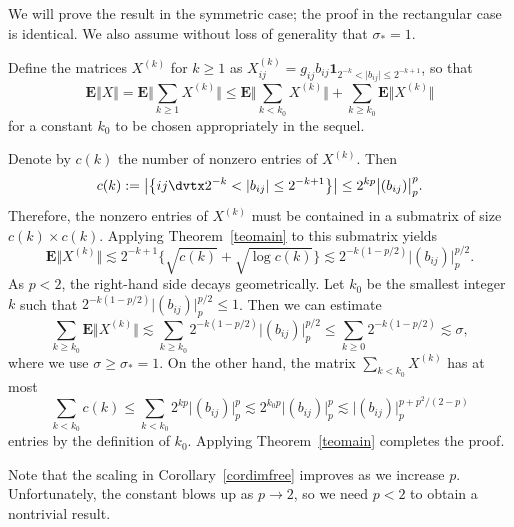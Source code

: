 \documentclass[aop,MSNbibl,dvips]{arximspdf}
\newcommand{\rrvert}{\vert}
\newcommand{\rrVert}{\Vert}
\newcommand{\llvert}{\vert}
\newcommand{\llVert}{\Vert}
\newcommand{\EE}{\mathbf{E}}
\begin{document}
\begin{pf}
We will prove the result in the symmetric case; the proof in the
rectangular case is identical. We also assume without loss of generality
that $\sigma_*=1$.

Define the matrices $X^{(k)}$ for $k\ge1$ as
$X^{(k)}_{ij}=g_{ij}b_{ij}\mathbf{1}_{2^{-k}<\llvert b_{ij}\rrvert \le
2^{-k+1}}$,
so that
%
\[
\EE\llVert X\rrVert= \EE\biggl\llVert\sum_{k\ge1}X^{(k)}
\biggr\rrVert\le\EE\biggl\llVert\sum_{k<k_0}X^{(k)}
\biggr\rrVert+ \sum_{k\ge k_0}\EE\bigl\llVert
X^{(k)}\bigr\rrVert%
\]
%
for a constant $k_0$ to be chosen appropriately in the sequel.

Denote by $c(k)$ the number of nonzero entries of $X^{(k)}$. Then
%
\[
c(k) := \bigl\llvert\bigl\{ij\dvtx2^{-k}<\llvert b_{ij}\rrvert
\le2^{-k+1}\bigr\}\bigr\rrvert\le2^{kp}\bigl\llvert
(b_{ij})\bigr\rrvert_p^p. %
\]
%
Therefore, the nonzero entries of $X^{(k)}$ must be
contained in a submatrix of size $c(k)\times c(k)$. Applying
Theorem~\ref{teomain} to this submatrix yields
%
\[
\EE\bigl\llVert X^{(k)}\bigr\rrVert\lesssim2^{-k+1}\bigl\{
\sqrt{c(k)}+\sqrt{\log c(k)}\bigr\} \lesssim2^{-k(1-p/2)}\bigl\llvert
(b_{ij})\bigr\rrvert_p^{p/2}. %
\]
%
As $p<2$, the right-hand side decays geometrically.
Let $k_0$ be the smallest integer $k$ such that
$2^{-k(1-p/2)}\llvert (b_{ij})\rrvert _p^{p/2}\le1$. Then we can estimate
%
\[
\sum_{k\ge k_0} \EE\bigl\llVert X^{(k)}\bigr
\rrVert\lesssim\sum_{k\ge k_0} 2^{-k(1-p/2)}\bigl
\llvert(b_{ij})\bigr\rrvert_p^{p/2} \le\sum
_{k\ge0} 2^{-k(1-p/2)} \lesssim\sigma, %
\]
%
where we use $\sigma\ge\sigma_*=1$.
On the other hand, the matrix $\sum_{k<k_0}X^{(k)}$ has at most
%
\[
\sum_{k<k_0}c(k) \le\sum
_{k<k_0}2^{kp}\bigl\llvert(b_{ij})\bigr
\rrvert_p^p \lesssim2^{k_0p}\bigl\llvert
(b_{ij})\bigr\rrvert_p^p \lesssim\bigl\llvert
(b_{ij})\bigr\rrvert_p^{p+p^2/(2-p)} %
\]
%
entries by the definition of $k_0$. Applying Theorem~\ref{teomain}
completes the proof.
\end{pf}

Note that the scaling in Corollary~\ref{cordimfree} improves as we
increase $p$. Unfortunately, the constant blows up as $p\to2$, so we
need $p<2$ to obtain a nontrivial result.
\end{document}
